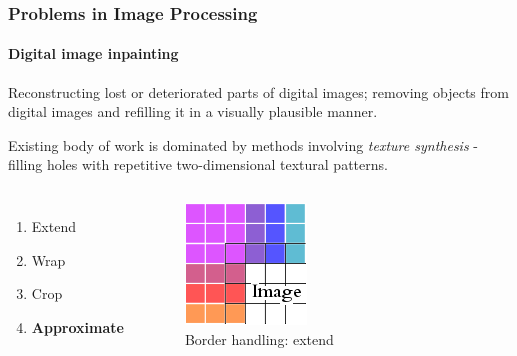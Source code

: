 \documentclass{beamer}
\begin{document}
\begin{frame}
\frametitle{Problems in Image Processing}
\framesubtitle{Digital image inpainting}

Reconstructing lost or deteriorated parts of digital images; removing objects from 
digital images and refilling it in a visually plausible manner.

Existing body of work is dominated by methods involving \textit{texture synthesis} - 
filling holes with repetitive two-dimensional textural patterns. 

\begin{columns}[c] %
\begin{enumerate}
	\item Extend 
	\item Wrap 
	\item Crop 
	\item \textbf{Approximate} 
\end{enumerate}
\begin{figure} %
\caption{Border handling: extend}
\centering
	\includegraphics[width=0.3\columnwidth]{../figures/Extend_Edge-Handling}
\end{figure}
\end{columns}

\end{frame}

\end{document}
